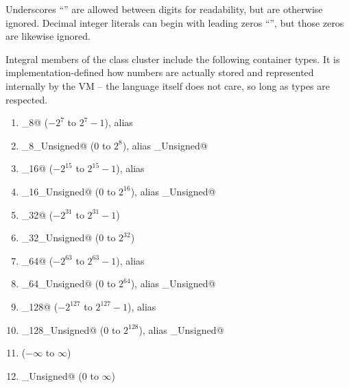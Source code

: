 Underscores ``\code{_}'' are allowed between digits for readability, but are otherwise ignored. Decimal integer literals can begin with leading zeros ``'', but those zeros are likewise ignored. 

Integral members of the \lstinline@Number@ class cluster include the following container types. It is implementation-defined how numbers are actually stored and represented internally by the VM -- the language itself does not care, so long as types are respected. 

\begin{enumerate}

  \item \lstinline@Integer_8@ ($-2^{7}$ to $2^{7}-1$), alias \lstinline@Byte@

  \item \lstinline@Integer_8_Unsigned@ ($0$ to $2^{8}$), alias \lstinline@Byte_Unsigned@

  \item \lstinline@Integer_16@ ($-2^{15}$ to $2^{15}-1$), alias \lstinline@Short@

  \item \lstinline@Integer_16_Unsigned@ ($0$ to $2^{16}$), alias \lstinline@Short_Unsigned@

  \item \lstinline@Integer_32@ ($-2^{31}$ to $2^{31}-1$)

  \item \lstinline@Integer_32_Unsigned@ ($0$ to $2^{32}$)

  \item \lstinline@Integer_64@ ($-2^{63}$ to $2^{63}-1$), alias \lstinline@Long@

  \item \lstinline@Integer_64_Unsigned@ ($0$ to $2^{64}$), alias \lstinline@Long_Unsigned@

  \item \lstinline@Integer_128@ ($-2^{127}$ to $2^{127}-1$), alias \lstinline@Cent@

  \item \lstinline@Integer_128_Unsigned@ ($0$ to $2^{128}$), alias \lstinline@Cent_Unsigned@

  \item \lstinline@Decimal@ ($-\infty$ to $\infty$)

  \item \lstinline@Decimal_Unsigned@ ($0$ to $\infty$)

\end{enumerate}

